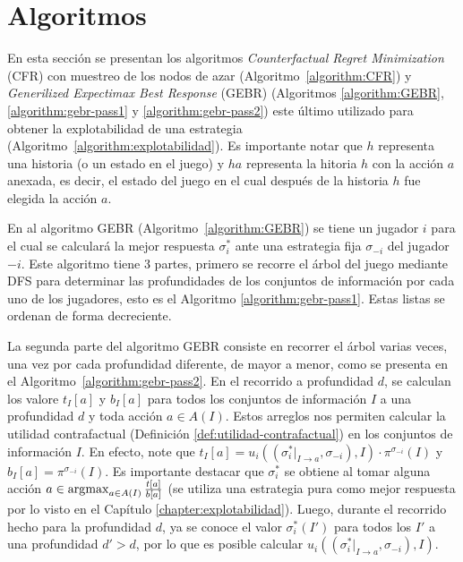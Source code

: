 \chapter{Algoritmos}
\label{apex:chapter:algoritmos}
\algnewcommand{\OR}{\algorithmicor}
\algnewcommand{\AND}{\algorithmicand}

En esta sección se presentan los algoritmos \textit{Counterfactual Regret Minimization} (CFR) con muestreo de los nodos de azar (Algoritmo~\ref{algorithm:CFR}) y \textit{Generilized Expectimax Best Response} (GEBR) (Algoritmos \ref{algorithm:GEBR}, \ref{algorithm:gebr-pass1} y \ref{algorithm:gebr-pass2}) este último utilizado para obtener la explotabilidad de una estrategia (Algoritmo~\ref{algorithm:explotabilidad}). Es importante notar que $h$ representa una historia (o un estado en el juego) y $ha$ representa la hitoria $h$ con la acción $a$ anexada, es decir, el estado del juego en el cual después de la historia $h$ fue elegida la acción $a$.

En al algoritmo GEBR (Algoritmo~\ref{algorithm:GEBR}) se tiene un jugador $i$ para el cual se calculará la mejor respuesta $\sigma^*_i$ ante una estrategia fija $\sigma_{-i}$ del jugador $-i$. Este algoritmo tiene $3$ partes, primero se recorre el árbol del juego mediante DFS para determinar las profundidades de los conjuntos de información por cada uno de los jugadores, esto es el Algoritmo \ref{algorithm:gebr-pass1}. Estas listas se ordenan de forma decreciente.

La segunda parte del algoritmo GEBR consiste en recorrer el árbol varias veces, una vez por cada profundidad diferente, de mayor a menor, como se presenta en el Algoritmo~\ref{algorithm:gebr-pass2}. En el recorrido a profundidad $d$, se calculan los valore $t_I[a]$ y $b_I[a]$ para todos los conjuntos de información $I$ a una profundidad $d$ y toda acción $a \in A(I)$. Estos arreglos nos permiten calcular la utilidad contrafactual (Definición \ref{def:utilidad-contrafactual}) en los conjuntos de información $I$. En efecto, note que $t_I[a] = u_i((\sigma^*_i|_{I \rightarrow a}, \sigma_{-i}),I) \cdot \pi^{\sigma_{-i}}(I)$ y $b_I[a] = \pi^{\sigma_{-i}}(I)$. Es importante destacar que $\sigma^*_i$ se obtiene al tomar alguna acción $a \in  \operatorname*{\arg\!\max}_{a \in A(I)} \frac{t[a]}{b[a]}$ (se utiliza una estrategia pura como mejor respuesta por lo visto en el Capítulo \ref{chapter:explotabilidad}). Luego, durante el recorrido hecho para la profundidad $d$, ya se conoce el valor $\sigma^*_i(I')$ para todos los $I'$ a una profundidad $d' > d$, por lo que es posible calcular  $u_i((\sigma^*_i|_{I \rightarrow a}, \sigma_{-i}),I)$.

